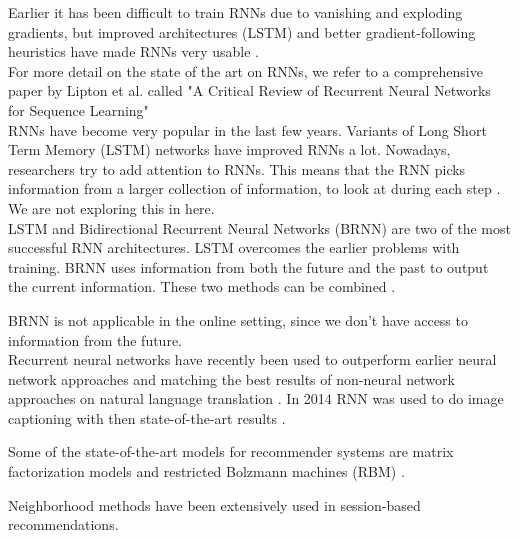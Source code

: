 Earlier it has been difficult to train RNNs due to vanishing and exploding gradients, but improved architectures (LSTM) and better gradient-following heuristics have made RNNs very usable \cite{DBLP:journals/corr/Lipton15}.\\


For more detail on the state of the art on RNNs, we refer to a comprehensive paper by Lipton et al. called "A Critical Review of Recurrent Neural Networks
for Sequence Learning" \cite{DBLP:journals/corr/Lipton15}\\

RNNs have become very popular in the last few years. Variants of Long Short Term Memory (LSTM) networks have improved RNNs a lot. Nowadays, researchers try to add attention to RNNs. This means that the RNN picks information from a larger collection of information, to look at during each step \cite{COLAH:understanding-lstm}. We are not exploring this in here.\\

LSTM and Bidirectional Recurrent Neural Networks (BRNN) are two of the most successful RNN architectures.
LSTM overcomes the earlier problems with training. BRNN uses information from both the future and the past to output the current information. These two methods can be combined \cite{DBLP:journals/corr/Lipton15}.

BRNN is not applicable in the online setting, since we don't have access to information from the future.\\


Recurrent neural networks have recently been used to outperform earlier neural network approaches and matching the best results of non-neural network approaches on natural language translation \cite{DBLP:journals/corr/SutskeverVL14}. In 2014 RNN was used to do image captioning with then state-of-the-art results \cite{DBLP:journals/corr/MaoXYWY14a}.

Some of the state-of-the-art models for recommender systems are matrix factorization models and restricted Bolzmann machines (RBM) \cite{AGS:implicit-recommender-systems}.

Neighborhood methods have been extensively used in session-based recommendations.

